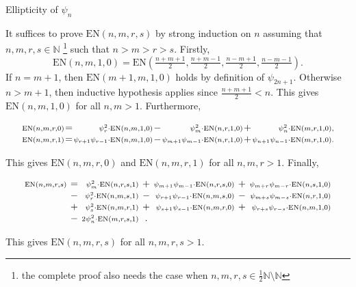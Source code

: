 \documentclass[10pt]{beamer}
\begin{document}
\begin{frame}[t]{Ellipticity of $ \psi_n $}

It suffices to prove $ \mathrm{EN}(n, m, r, s) $ by strong induction on $ n $ assuming that $ n, m, r, s \in \mathbb{N} $ \footnote{the complete proof also needs the case when $ n, m, r, s \in \tfrac{1}{2}\mathbb{N} \setminus \mathbb{N} $} such that $ n > m > r > s $. \pause Firstly,
$$ \mathrm{EN}(n, m, 1, 0) = \mathrm{EN}(\tfrac{n + m + 1}{2}, \tfrac{n + m - 1}{2}, \tfrac{n - m + 1}{2}, \tfrac{n - m - 1}{2}). $$
If $ n = m + 1 $, then $ \mathrm{EN}(m + 1, m, 1, 0) $ holds by definition of $ \psi_{2n + 1} $. Otherwise $ n > m + 1 $, then inductive hypothesis applies since $ \tfrac{n + m + 1}{2} < n $. This gives $ \mathrm{EN}(n, m, 1, 0) $ for all $ n, m > 1 $. \pause Furthermore,

\vspace{-0.5cm}
$$
\arraycolsep=0.5pt
\begin{array}{rcrcrcr}
\scriptstyle \mathrm{EN}(n, m, r, 0) & = & \scriptstyle \psi_r^2 \cdot \mathrm{EN}(n, m, 1, 0) & - & \scriptstyle \psi_m^2 \cdot \mathrm{EN}(n, r, 1, 0) & + & \scriptstyle \psi_n^2 \cdot \mathrm{EN}(m, r, 1, 0), \\
\scriptstyle \mathrm{EN}(n, m, r, 1) & = & \scriptstyle \psi_{r + 1}\psi_{r - 1} \cdot \mathrm{EN}(n, m, 1, 0) & - & \scriptstyle \psi_{m + 1}\psi_{m - 1} \cdot \mathrm{EN}(n, r, 1, 0) & + & \scriptstyle \psi_{n + 1}\psi_{n - 1} \cdot \mathrm{EN}(m, r, 1, 0).
\end{array}
$$
\vspace{-0.25cm}

This gives $ \mathrm{EN}(n, m, r, 0) $ and $ \mathrm{EN}(n, m, r, 1) $ for all $ n, m, r > 1 $. \pause Finally,

\vspace{-0.5cm}
$$
\arraycolsep=2pt
\begin{array}{rcrcrcr}
\scriptstyle \mathrm{EN}(n, m, r, s) & = & \scriptstyle \psi_m^2 \cdot \mathrm{EN}(n, r, s, 1) & + & \scriptstyle \psi_{m + 1}\psi_{m - 1} \cdot \mathrm{EN}(n, r, s, 0) & + & \scriptstyle \psi_{m + r}\psi_{m - r} \cdot \mathrm{EN}(n, s, 1, 0) \\
& - & \scriptstyle \psi_r^2 \cdot \mathrm{EN}(n, m, s, 1) & - & \scriptstyle \psi_{r + 1}\psi_{r - 1} \cdot \mathrm{EN}(n, m, s, 0) & - & \scriptstyle \psi_{m + s}\psi_{m - s} \cdot \mathrm{EN}(n, r, 1, 0) \\
& + & \scriptstyle \psi_s^2 \cdot \mathrm{EN}(n, m, r, 1) & + & \scriptstyle \psi_{s + 1}\psi_{s - 1} \cdot \mathrm{EN}(n, m, r, 0) & + & \scriptstyle \psi_{r + s}\psi_{r - s} \cdot \mathrm{EN}(n, m, 1, 0) \\
& - & \scriptstyle 2\psi_n^2 \cdot \mathrm{EN}(m, r, s, 1) & . & & &
\end{array}
$$
\vspace{-0.25cm}

This gives $ \mathrm{EN}(n, m, r, s) $ for all $ n, m, r, s > 1 $.

\end{frame}
\end{document}
